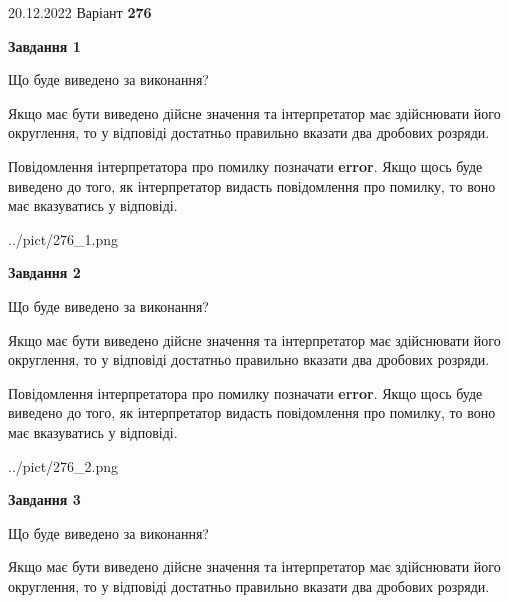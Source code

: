 \documentclass[12pt, ukrainian]{article}
\begin{document}
{20.12.2022 Варіант \No \textbf { 276 }\par}
{
\begin {Large}

{\begin {center}\textbf{Завдання 1}\end {center}}\par
Що буде виведено за виконання? \par

Якщо має бути виведено дійсне значення та інтерпретатор має здійснювати його округлення, 
то у відповіді достатньо правильно вказати два дробових розряди.

Повідомлення інтерпретатора про помилку позначати \textbf{error}.
Якщо щось буде виведено до того, як інтерпретатор видасть повідомлення про помилку, 
то воно має вказуватись у відповіді. \par

\begin{center}
	{../pict/276_1.png}
\end{center}
\newpage

{\begin {center}\textbf{Завдання 2}\end {center}}\par
Що буде виведено за виконання? \par

Якщо має бути виведено дійсне значення та інтерпретатор має здійснювати його округлення, 
то у відповіді достатньо правильно вказати два дробових розряди.

Повідомлення інтерпретатора про помилку позначати \textbf{error}.
Якщо щось буде виведено до того, як інтерпретатор видасть повідомлення про помилку, 
то воно має вказуватись у відповіді. \par

\begin{center}
	{../pict/276_2.png}
\end{center}
\newpage

{\begin {center}\textbf{Завдання 3}\end {center}}\par
Що буде виведено за виконання? \par

Якщо має бути виведено дійсне значення та інтерпретатор має здійснювати його округлення, 
то у відповіді достатньо правильно вказати два дробових розряди.


\end{Large}}
\end{document}
